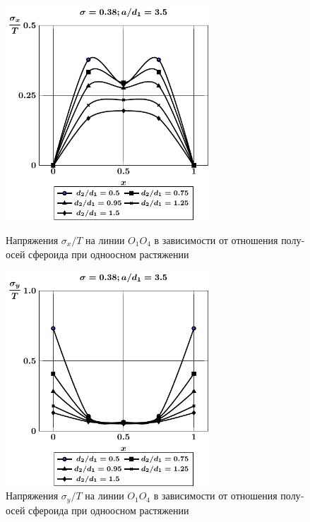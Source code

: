 \begin{russian}
\begin{figure}[h!]
\centering\footnotesize
\parbox[b]{7.5cm}{\centering\includegraphics[width=7.6cm]{cav4-prolate-oblate-a35-t1-sig_x.pdf}
\caption{Напряжения $\sigma_x/T$ на линии $O_1O_4$ в зависимости от отношения полуосей сфероида при одноосном растяжении
\label{f:10:8}}}\hfil\hfil
\parbox[b]{7.5cm}{\centering\includegraphics[width=7.6cm]{cav4-prolate-oblate-a35-t1-sig_y.pdf}
\caption{Напряжения $\sigma_y/T$ на линии $O_1O_4$ в зависимости от отношения полуосей сфероида при одноосном растяжении
\label{f:10:9}}}
\end{figure}


\end{russian}

